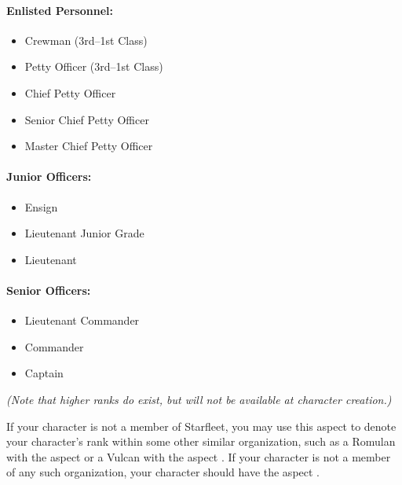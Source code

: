 \documentclass[12pt,titlepage,openany]{book}
\begin{document}
\begin{multicols}{2}
    \raggedcolumns
    \paragraph{Enlisted Personnel:}
    \begin{itemize}
        \item Crewman (3rd--1st Class)
        \item Petty Officer (3rd--1st Class)
        \item Chief Petty Officer
        \item Senior Chief Petty Officer
        \item Master Chief Petty Officer
    \end{itemize}

    \columnbreak
    \paragraph{Junior Officers:}
    \begin{itemize}
        \item Ensign
        \item Lieutenant Junior Grade
        \item Lieutenant
    \end{itemize}

    \paragraph{Senior Officers:}
    \begin{itemize}
        \item Lieutenant Commander
        \item Commander
        \item Captain
    \end{itemize}
\end{multicols}

\noindent \emph{(Note that higher ranks do exist, but will not be available at
character creation.)}

\vspace{1em}

If your character is not a member of Starfleet, you may use this aspect to
denote your character's rank within some other similar organization, such as a
Romulan with the aspect  or a Vulcan with the aspect
. If your character is not a member of any such
organization, your character should have the aspect .
\end{document}
